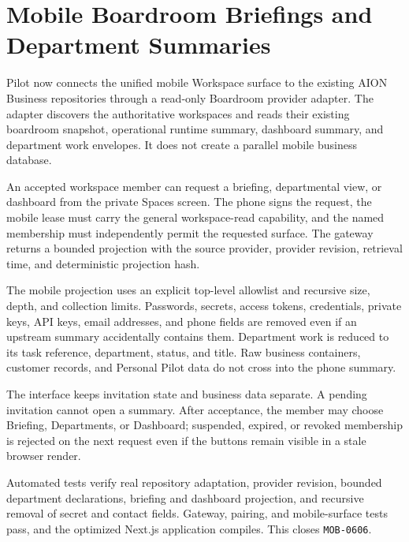 \section{Mobile Boardroom Briefings and Department Summaries}
\label{sec:pilot-mobile-boardroom-summaries}
\raggedright

Pilot now connects the unified mobile Workspace surface to the existing AION Business
repositories through a read-only Boardroom provider adapter.  The adapter discovers the
authoritative workspaces and reads their existing boardroom snapshot, operational runtime
summary, dashboard summary, and department work envelopes.  It does not create a parallel
mobile business database.

An accepted workspace member can request a briefing, departmental view, or dashboard from
the private Spaces screen.  The phone signs the request, the mobile lease must carry the
general workspace-read capability, and the named membership must independently permit the
requested surface.  The gateway returns a bounded projection with the source provider,
provider revision, retrieval time, and deterministic projection hash.

The mobile projection uses an explicit top-level allowlist and recursive size, depth, and
collection limits.  Passwords, secrets, access tokens, credentials, private keys, API keys,
email addresses, and phone fields are removed even if an upstream summary accidentally
contains them.  Department work is reduced to its task reference, department, status, and
title.  Raw business containers, customer records, and Personal Pilot data do not cross
into the phone summary.

The interface keeps invitation state and business data separate.  A pending invitation
cannot open a summary.  After acceptance, the member may choose Briefing, Departments, or
Dashboard; suspended, expired, or revoked membership is rejected on the next request even
if the buttons remain visible in a stale browser render.

Automated tests verify real repository adaptation, provider revision, bounded department
declarations, briefing and dashboard projection, and recursive removal of secret and
contact fields.  Gateway, pairing, and mobile-surface tests pass, and the optimized Next.js
application compiles.  This closes \texttt{MOB-0606}.

